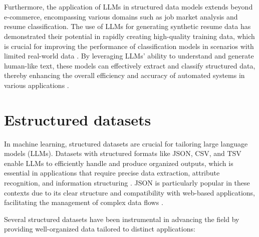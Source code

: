 \\\\
Furthermore, the application of LLMs in structured data models extends beyond e-commerce, encompassing various domains such as job market analysis and resume classification. The use of LLMs for generating synthetic resume data has demonstrated their potential in rapidly creating high-quality training data, which is crucial for improving the performance of classification models in scenarios with limited real-world data \cite{skondras2023generating}. By leveraging LLMs' ability to understand and generate human-like text, these models can effectively extract and classify structured data, thereby enhancing the overall efficiency and accuracy of automated systems in various applications \cite{tang2024strucbench}.

\section{Estructured datasets}
In machine learning, structured datasets are crucial for tailoring large language models (LLMs). Datasets with structured formats like JSON, CSV, and TSV enable LLMs to efficiently handle and produce organized outputs, which is essential in applications that require precise data extraction, attribute recognition, and information structuring \cite{singha2023tabularrepresentationnoisyoperators}. JSON is particularly popular in these contexts due to its clear structure and compatibility with web-based applications, facilitating the management of complex data flows \cite{gao2024jsontuning}.

Several structured datasets have been instrumental in advancing the field by providing well-organized data tailored to distinct applications:

